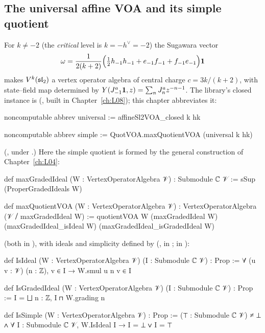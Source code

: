 \subsection{The universal affine VOA and its simple quotient}

For $k\neq -2$ (the \emph{critical} level is $k = -h^\vee = -2$) the Sugawara vector
\begin{equation*}
  \omega = \frac{1}{2(k+2)}\Bigl(\tfrac12 h_{-1}h_{-1} + e_{-1}f_{-1} + f_{-1}e_{-1}\Bigr)\mathbf{1}
\end{equation*}
makes $V^k(\mathfrak{sl}_2)$ a vertex operator algebra of central charge $c = 3k/(k+2)$, with state--field
map determined by $Y(J^a_{-1}\mathbf{1}, z) = \sum_n J^a_n z^{-n-1}$. The library's closed instance is
 (, built in
Chapter~\ref{ch:L08}); this chapter abbreviates it:

\begin{leancode}
noncomputable abbrev universal := affineSl2VOA_closed k hk
\end{leancode}
\begin{leancode}
noncomputable abbrev simple := QuotVOA.maxQuotientVOA (universal k hk)
\end{leancode}
(, under .)
Here the simple quotient is formed by the general construction of Chapter~\ref{ch:L04}:

\begin{leancode}
def maxGradedIdeal (W : VertexOperatorAlgebra 𝒱) : Submodule ℂ 𝒱 :=
  sSup (ProperGradedIdeals W)
\end{leancode}
\begin{leancode}
def maxQuotientVOA (W : VertexOperatorAlgebra 𝒱) :
    VertexOperatorAlgebra (𝒱 ⧸ maxGradedIdeal W) :=
  quotientVOA W (maxGradedIdeal W) (maxGradedIdeal_isIdeal W) (maxGradedIdeal_isGradedIdeal W)
\end{leancode}
(both in ), with ideals and simplicity defined by
(,  in ;  in
):

\begin{leancode}
def IsIdeal (W : VertexOperatorAlgebra 𝒱) (I : Submodule ℂ 𝒱) : Prop :=
  ∀ (u v : 𝒱) (n : ℤ), v ∈ I → W.smul u n v ∈ I
\end{leancode}
\begin{leancode}
def IsGradedIdeal (W : VertexOperatorAlgebra 𝒱) (I : Submodule ℂ 𝒱) : Prop :=
  I = ⨆ n : ℤ, I ⊓ W.grading n
\end{leancode}
\begin{leancode}
def IsSimple (W : VertexOperatorAlgebra 𝒱) : Prop :=
  (⊤ : Submodule ℂ 𝒱) ≠ ⊥ ∧ ∀ I : Submodule ℂ 𝒱, W.IsIdeal I → I = ⊥ ∨ I = ⊤
\end{leancode}

